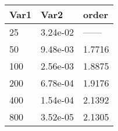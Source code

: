\begin{tabular}{lll}
Var1 & Var2 & order \\ 
\hline 
25 & 3.24e-02 & ------ \\ 
50 & 9.48e-03 & 1.7716 \\ 
100 & 2.56e-03 & 1.8875 \\ 
200 & 6.78e-04 & 1.9176 \\ 
400 & 1.54e-04 & 2.1392 \\ 
800 & 3.52e-05 & 2.1305 \\ 
\hline 
\end{tabular}